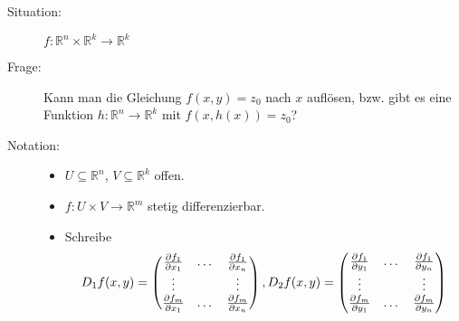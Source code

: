 \begin{description}
	\item[Situation:] $f: \mathbb{R}^n \times \mathbb{R}^k \to \mathbb{R}^k$ 
	\item[Frage:] Kann man die Gleichung $f(x,y)=z_0$ nach $x$ auflösen, bzw. gibt es eine Funktion $h:\mathbb{R}^n \to \mathbb{R}^k$ mit $f(x,h(x))=z_0$?
	\item[Notation:] \begin{itemize}
		\item $ U \subseteq \mathbb{R}^n$, $V \subseteq \mathbb{R}^k$ offen. 
		\item $ f: U \times V \to \mathbb{R}^m $ stetig differenzierbar.
		\item Schreibe 
		\begin{align*}
			D_1f(x,y)= \begin{pmatrix}
				\frac{{\partial f_1}}{{\partial x_1}} & \dots & \frac{{\partial f_1}}{{\partial x_n}}  \\
				\vdots & & \vdots \\
				\frac{{\partial f_m}}{{\partial x_1}}  & \dots & \frac{{\partial f_m}}{{\partial x_n}}  
			\end{pmatrix} , 
			D_2f(x,y)= \begin{pmatrix}
				\frac{{\partial f_1}}{{\partial y_1}} & \dots & \frac{{\partial f_1}}{{\partial y_n}}  \\
				\vdots & & \vdots \\
				\frac{{\partial f_m}}{{\partial y_1}}  & \dots & \frac{{\partial f_m}}{{\partial y_n}}  
			\end{pmatrix}
		\end{align*}  
		\end{itemize}
\end{description}
